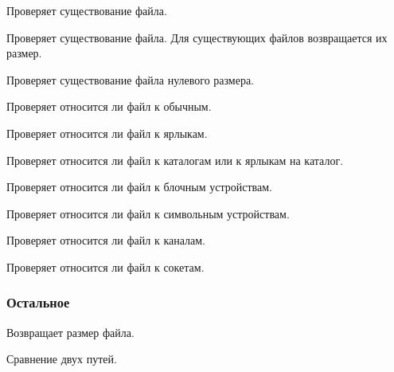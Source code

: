 \begin{methodlist}
  Проверяет существование файла. 

  Проверяет существование файла. Для существующих файлов возвращается их размер.

  Проверяет существование файла нулевого размера. 

  Проверяет относится ли файл к обычным. 

  Проверяет относится ли файл к ярлыкам. 

  Проверяет относится ли файл к каталогам или к ярлыкам на каталог. 

  Проверяет относится ли файл к блочным устройствам. 

  Проверяет относится ли файл к символьным устройствам. 

  Проверяет относится ли файл к каналам. 

  Проверяет относится ли файл к сокетам.
\end{methodlist}

\subsubsection*{Остальное}

\begin{methodlist}
  Возвращает размер файла.

  Сравнение двух путей.
\end{methodlist}